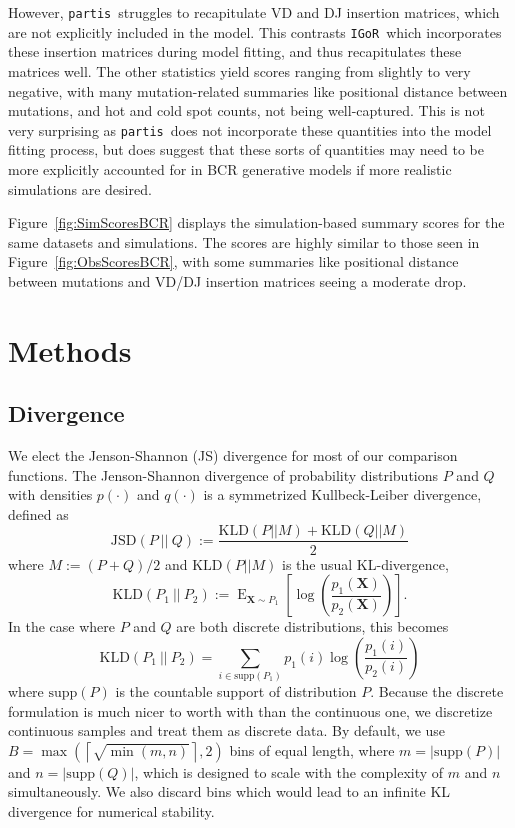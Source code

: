\documentclass{article}
\newcommand{\partis}{\texttt{partis}}
\newcommand{\igor}{\texttt{IGoR}}
\begin{document}
However, \partis\ struggles to recapitulate VD and DJ insertion matrices, which are not explicitly included in the model.
This contrasts \igor\ which incorporates these insertion matrices during model fitting, and thus recapitulates these matrices well.
The other statistics yield scores ranging from slightly to very negative, with many mutation-related summaries like positional distance between mutations, and hot and cold spot counts, not being well-captured.
This is not very surprising as \partis\ does not incorporate these quantities into the model fitting process, but does suggest that these sorts of quantities may need to be more explicitly accounted for in BCR generative models if more realistic simulations are desired.


Figure~\ref{fig:SimScoresBCR} displays the simulation-based summary scores for the same datasets and simulations.
The scores are highly similar to those seen in Figure~\ref{fig:ObsScoresBCR}, with some summaries like positional distance between mutations and VD/DJ insertion matrices seeing a moderate drop.


\section*{Methods}
\subsection*{Divergence}
We elect the Jenson-Shannon (JS) divergence for most of our comparison functions.
The Jenson-Shannon divergence of probability distributions $P$ and $Q$ with densities $p(\cdot)$ and $q(\cdot)$ is a symmetrized Kullbeck-Leiber divergence, defined as
\begin{equation}
\text{JSD}\left(P \ || \ Q\right) := \frac{\text{KLD}\left(P || M\right) + \text{KLD}\left(Q || M\right)}{2}
\end{equation}
where $M := (P + Q)/2$ and $\text{KLD}(P || M)$ is the usual KL-divergence,
\begin{equation}
\text{KLD}\left(P_1 \ || \ P_2\right) := \operatorname{E}_{\mathbf X \sim P_1}\left[ \log\left(\frac{p_1(\mathbf X)}{p_2(\mathbf X)}\right) \right].
\end{equation}
In the case where $P$ and $Q$ are both discrete distributions, this becomes
\begin{equation}
\text{KLD}\left(P_1 \ || \ P_2\right) = \sum_{i \in \text{supp}(P_1)} p_1(i) \log\left( \frac{p_1(i)}{p_2(i)} \right)
\end{equation}
where $\text{supp}(P)$ is the countable support of distribution $P$.
Because the discrete formulation is much nicer to worth with than the continuous one, we discretize continuous samples and treat them as discrete data.
By default, we use $B = \max\left(\left\lceil \sqrt{\min(m, n)} \right \rceil, 2\right)$ bins of equal length, where $m = |\text{supp}(P)|$ and $n = |\text{supp}(Q)|$, which is designed to scale with the complexity of $m$ and $n$ simultaneously.
We also discard bins which would lead to an infinite KL divergence for numerical stability.
\end{document}
